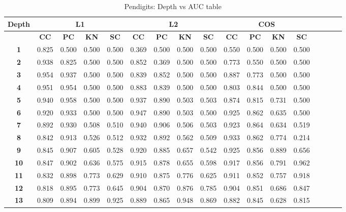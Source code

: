 \begin{table*}[!t]
\caption{Pendigits: Depth vs AUC table}
\label{comparisons:pendigits}
\centering
\begin{tabular}{|c|c|c|c|c|c|c|c|c|c|c|c|c|c|c|c|c|}
\hline
\bfseries Depth & \multicolumn{4}{c|}{\textbf{L1}} & \multicolumn{4}{c|}{\textbf{L2}} & \multicolumn{4}{c|}{\textbf{COS}} \\
\hline
\bfseries  & \bfseries CC & \bfseries PC & \bfseries KN & \bfseries SC & \bfseries CC & \bfseries PC & \bfseries KN & \bfseries SC & \bfseries CC & \bfseries PC & \bfseries KN & \bfseries SC \\
\hline
\bfseries 1 & 0.825 & 0.500 & 0.500 & 0.500 & 0.369 & 0.500 & 0.500 & 0.500 & 0.550 & 0.500 & 0.500 & 0.500 \\
\hline
\bfseries 2 & 0.938 & 0.825 & 0.500 & 0.500 & 0.852 & 0.369 & 0.500 & 0.500 & 0.773 & 0.550 & 0.500 & 0.500 \\
\hline
\bfseries 3 & 0.954 & 0.937 & 0.500 & 0.500 & 0.839 & 0.852 & 0.500 & 0.500 & 0.887 & 0.773 & 0.500 & 0.500 \\
\hline
\bfseries 4 & 0.951 & 0.954 & 0.500 & 0.500 & 0.883 & 0.839 & 0.500 & 0.500 & 0.803 & 0.844 & 0.500 & 0.500 \\
\hline
\bfseries 5 & 0.940 & 0.958 & 0.500 & 0.500 & 0.937 & 0.890 & 0.503 & 0.503 & 0.874 & 0.815 & 0.731 & 0.500 \\
\hline
\bfseries 6 & 0.920 & 0.933 & 0.500 & 0.500 & 0.947 & 0.890 & 0.503 & 0.500 & 0.925 & 0.862 & 0.635 & 0.500 \\
\hline
\bfseries 7 & 0.892 & 0.930 & 0.508 & 0.510 & 0.940 & 0.906 & 0.506 & 0.503 & 0.923 & 0.864 & 0.634 & 0.519 \\
\hline
\bfseries 8 & 0.842 & 0.913 & 0.526 & 0.512 & 0.932 & 0.892 & 0.562 & 0.509 & 0.933 & 0.862 & 0.774 & 0.214 \\
\hline
\bfseries 9 & 0.845 & 0.907 & 0.605 & 0.528 & 0.920 & 0.885 & 0.657 & 0.542 & 0.925 & 0.856 & 0.889 & 0.656 \\
\hline
\bfseries 10 & 0.847 & 0.902 & 0.636 & 0.575 & 0.915 & 0.878 & 0.655 & 0.598 & 0.917 & 0.856 & 0.791 & 0.962 \\
\hline
\bfseries 11 & 0.832 & 0.898 & 0.773 & 0.629 & 0.910 & 0.875 & 0.776 & 0.625 & 0.911 & 0.852 & 0.757 & 0.918 \\
\hline
\bfseries 12 & 0.818 & 0.895 & 0.773 & 0.645 & 0.904 & 0.870 & 0.876 & 0.785 & 0.904 & 0.851 & 0.686 & 0.847 \\
\hline
\bfseries 13 & 0.809 & 0.894 & 0.899 & 0.925 & 0.889 & 0.865 & 0.948 & 0.869 & 0.882 & 0.845 & 0.628 & 0.815 \\

\end{tabular}
\end{table*}
